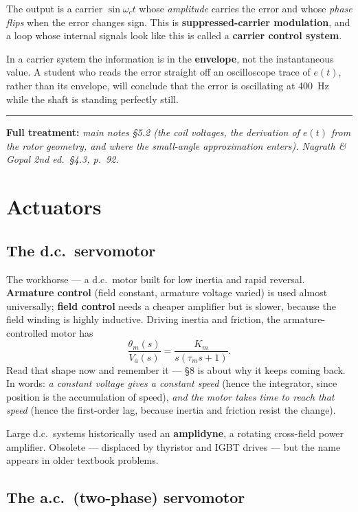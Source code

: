\documentclass[11pt,a4paper]{article}
\newcommand{\fullmath}[1]{%
  \par\smallskip\noindent
  \textcolor{fnavy}{\rule{\textwidth}{0.4pt}}\par\vspace{-4pt}
  {\small\textcolor{fnavy}{\textbf{Full treatment:}} \textit{#1}}\par\smallskip}
\begin{document}
The output is a carrier $\sin\omega_{c}t$ whose \emph{amplitude} carries the
error and whose \emph{phase flips} when the error changes sign. This is
\textbf{suppressed-carrier modulation}, and a loop whose internal signals look
like this is called a \textbf{carrier control system}.

\begin{pitfall}
In a carrier system the information is in the \textbf{envelope}, not the
instantaneous value. A student who reads the error straight off an oscilloscope
trace of $e(t)$, rather than its envelope, will conclude that the error is
oscillating at \SI{400}{\hertz} while the shaft is standing perfectly still.
\end{pitfall}

\fullmath{main notes \S5.2 (the coil voltages, the derivation of $e(t)$ from the rotor geometry, and where the small-angle approximation enters). Nagrath \& Gopal 2nd ed.\ \S4.3, p.~92.}

\section{Actuators}

\subsection*{The d.c.\ servomotor}

The workhorse --- a d.c.\ motor built for low inertia and rapid reversal.
\textbf{Armature control} (field constant, armature voltage varied) is used
almost universally; \textbf{field control} needs a cheaper amplifier but is
slower, because the field winding is highly inductive. Driving inertia and
friction, the armature-controlled motor has
\[
  \frac{\theta_{m}(s)}{V_{a}(s)}=\frac{K_{m}}{s(\tau_{m}s+1)} .
\]
Read that shape now and remember it --- \S8 is about why it keeps coming back.
In words: \emph{a constant voltage gives a constant speed} (hence the
integrator, since position is the accumulation of speed), \emph{and the motor
takes time to reach that speed} (hence the first-order lag, because inertia and
friction resist the change).

\smallskip
Large d.c.\ systems historically used an \textbf{amplidyne}, a rotating
cross-field power amplifier. Obsolete --- displaced by thyristor and IGBT
drives --- but the name appears in older textbook problems.

\subsection*{The a.c.\ (two-phase) servomotor}
\end{document}
